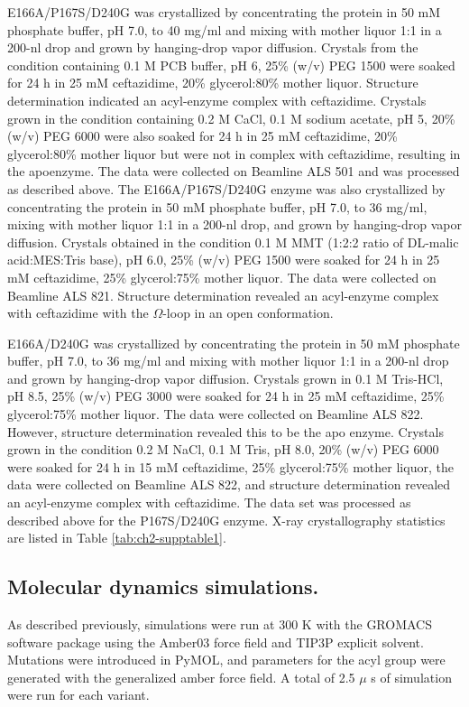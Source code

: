 \documentclass[../main.tex]{subfiles}
\begin{document}
        E166A/P167S/D240G was crystallized by concentrating the protein in 50 mM phosphate buffer, pH 7.0, to 40 mg/ml and mixing with mother liquor 1:1 in a 200-nl drop and grown by hanging-drop vapor diffusion. Crystals from the condition containing 0.1 M PCB buffer, pH 6, 25\% (w/v) PEG 1500 were soaked for 24 h in 25 mM ceftazidime, 20\% glycerol:80\% mother liquor. Structure determination indicated an acyl-enzyme complex with ceftazidime. Crystals grown in the condition containing 0.2 M CaCl, 0.1 M sodium acetate, pH 5, 20\% (w/v) PEG 6000 were also soaked for 24 h in 25 mM ceftazidime, 20\% glycerol:80\% mother liquor but were not in complex with ceftazidime, resulting in the apoenzyme. The data were collected on Beamline ALS 501 and was processed as described above. The E166A/P167S/D240G enzyme was also crystallized by concentrating the protein in 50 mM phosphate buffer, pH 7.0, to 36 mg/ml, mixing with mother liquor 1:1 in a 200-nl drop, and grown by hanging-drop vapor diffusion. Crystals obtained in the condition 0.1 M MMT (1:2:2 ratio of DL-malic acid:MES:Tris base), pH 6.0, 25\% (w/v) PEG 1500 were soaked for 24 h in 25 mM ceftazidime, 25\% glycerol:75\% mother liquor. The data were collected on Beamline ALS 821. Structure determination revealed an acyl-enzyme complex with ceftazidime with the $\Omega$-loop in an open conformation.

        E166A/D240G was crystallized by concentrating the protein in 50 mM phosphate buffer, pH 7.0, to 36 mg/ml and mixing with mother liquor 1:1 in a 200-nl drop and grown by hanging-drop vapor diffusion. Crystals grown in 0.1 M Tris-HCl, pH 8.5, 25\% (w/v) PEG 3000 were soaked for 24 h in 25 mM ceftazidime, 25\% glycerol:75\% mother liquor. The data were collected on Beamline ALS 822. However, structure determination revealed this to be the apo enzyme. Crystals grown in the condition 0.2 M NaCl, 0.1 M Tris, pH 8.0, 20\% (w/v) PEG 6000 were soaked for 24 h in 15 mM ceftazidime, 25\% glycerol:75\% mother liquor, the data were collected on Beamline ALS 822, and structure determination revealed an acyl-enzyme complex with ceftazidime. The data set was processed as described above for the P167S/D240G enzyme. X-ray crystallography statistics are listed in Table \ref{tab:ch2-supptable1}.

    \subsection{Molecular dynamics simulations.}
        As described previously\cite{Hart:2016kb}, simulations were run at 300 K with the GROMACS software package\cite{Hart:2016kb,Berendsen:1995dd,Abraham:2015gj,VanDerSpoel:2005hz} using the Amber03 force field\cite{Duan:2003gt} and TIP3P explicit solvent\cite{Jorgensen:1983fl}. Mutations were introduced in PyMOL\cite{DeLano:2010wf}, and parameters for the acyl group were generated with the generalized amber force field\cite{sousa_da_silva_acpype_2012,wang_development_2004,wang_automatic_2006}. A total of 2.5 $\mu$ s of simulation were run for each variant.
\end{document}
